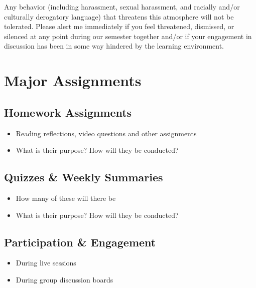 \documentclass[11pt]{article}
\def\tightlist{}
\begin{document}
Any behavior (including harassment, sexual harassment, and racially
and/or culturally derogatory language) that threatens this atmosphere
will not be tolerated. Please alert me immediately if you feel
threatened, dismissed, or silenced at any point during our semester
together and/or if your engagement in discussion has been in some way
hindered by the learning environment.

\hypertarget{major-assignments}{%
\section{Major Assignments}\label{major-assignments}}

\hypertarget{homework-assignments}{%
\subsection{Homework Assignments}\label{homework-assignments}}

\begin{itemize}
\tightlist
\item
  Reading reflections, video questions and other assignments
\item
  What is their purpose? How will they be conducted?
\end{itemize}

\hypertarget{quizzes-weekly-summaries}{%
\subsection{Quizzes \& Weekly
Summaries}\label{quizzes-weekly-summaries}}

\begin{itemize}
\tightlist
\item
  How many of these will there be
\item
  What is their purpose? How will they be conducted?
\end{itemize}

\hypertarget{participation-engagement}{%
\subsection{Participation \&
Engagement}\label{participation-engagement}}

\begin{itemize}
\tightlist
\item
  During live sessions
\item
  During group discussion boards
\end{itemize}
\end{document}
